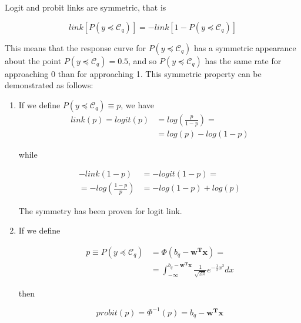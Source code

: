 \documentclass[journal]{IEEEtran}
\begin{document}
	Logit and probit links are symmetric, that is
	
	\begin{equation}
	link[P(y \preceq \mathcal{C}_q)] = -link[1 - P(y \preceq \mathcal{C}_q)]
	\end{equation}
	
	This means that the response curve for $P(y \preceq \mathcal{C}_q)$ has a symmetric appearance about the point $P(y \preceq \mathcal{C}_q) = 0.5$, and so $P(y \preceq \mathcal{C}_q)$ has the same rate for approaching 0 than for approaching 1. This symmetric property can be demonstrated as follows:
	
	\begin{enumerate}
		\item If we define $P(y \preceq \mathcal{C}_q) \equiv p$, we have
			\begin{equation}
			\begin{aligned}
			link(p) = logit(p) &= log\left(\frac{p}{1-p}\right) =\\
			&= log(p) - log(1-p)
			\end{aligned}
			\end{equation}
			
			while
			
			\begin{equation}
			\begin{aligned}
			-link(1 - p) &= -logit(1 - p) =\\
			=- log\left(\frac{1- p}{p}\right) &= - log(1 - p) + log(p)
			\end{aligned}
			\end{equation}
			
			The symmetry has been proven for logit link.
			
		\item If we define 
		
		\begin{equation}
		\begin{aligned}
		p \equiv P(y \preceq \mathcal{C}_q) &= \Phi(b_q - \mathbf{w^Tx}) =\\
		&= \int_{-\infty}^{b_q - \mathbf{w^Tx}} \frac{1}{\sqrt{2\pi}} e^{-\frac{1}{2}x^2} dx
		\end{aligned}
		\end{equation}
		
		then
		
		\begin{equation}
		probit(p) = \Phi^{-1}(p) = b_q - \mathbf{w^Tx}
		\end{equation}
		

\end{enumerate}
\end{document}
